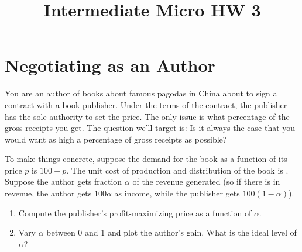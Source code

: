 \documentclass{article}
\begin{document}
\title{Intermediate Micro HW 3}

\maketitle

\section*{Negotiating as an Author}
You are an author of books about famous pagodas in China about to sign a contract with a book publisher. Under the terms of the contract, the publisher has the sole authority to set the price. The only issue is what percentage of the gross receipts you get. The question we'll target is: Is it always the case that you would want as high a percentage of gross receipts as possible?

To make things concrete, suppose the demand for the book as a function of its price $p$ is $100-p$. The unit cost of production and distribution of the book is . Suppose the author gets fraction $\alpha$ of the revenue generated (so if there is  in revenue, the author gets $100\alpha$ as income, while the publisher gets $100(1-\alpha)$). 

\begin{enumerate}
\item Compute the publisher's profit-maximizing price as a function of $\alpha$.
\item Vary $\alpha$ between 0 and 1 and plot the author's gain. What is the ideal level of $\alpha$?
\end{enumerate}
\end{document}

